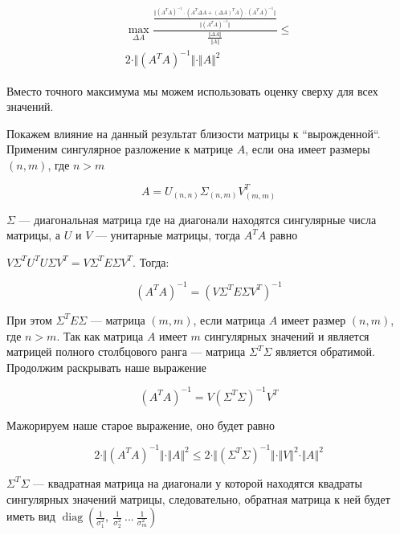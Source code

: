 \documentclass{article}
\begin{document}
    \[
        \begin{gathered}
            \max_{\Delta A} \frac{ \frac{\Vert  (A^{T} A)^{-1} \cdot (A^{T} \Delta A + (\Delta A)^{T} A) \cdot (A^{T} A)^{-1} \Vert }{\Vert (A^T A)^{-1} \Vert} }{ \frac{\Vert \Delta A \Vert}{\Vert A \Vert} } \leq \\
            2 \cdot \Vert (A^{T} A)^{-1} \Vert \cdot \Vert A \Vert^{2}
        \end{gathered}
    \]

    Вместо точного максимума мы можем использовать оценку сверху для всех значений.

    Покажем влияние на данный результат близости матрицы к ``вырожденной``.
    Применим сингулярное разложение к матрице $A$, если она имеет размеры $(n, m)$, где $n > m$

    \begin{equation}
        A = U_{(n, n)} \Sigma_{(n, m)} V^{T}_{(m, m)}
    \end{equation}

    $\Sigma$ --- диагональная матрица где на диагонали находятся сингулярные числа матрицы, а $U$ и $V$ --- унитарные матрицы, тогда
    $A^{T}A$ равно

    $V \Sigma^{T} U^{T}  U \Sigma V^{T} = V \Sigma^{T} E \Sigma V^{T}$.
    Тогда:

    \begin{equation}
    (A^{T}A)^{-1} = (V \Sigma^{T} E \Sigma V^{T})^{-1}
    \end{equation}

    При этом $\Sigma^{T} E \Sigma $ --- матрица $(m, m)$, если матрица $A$ имеет размер $(n, m)$, где $n > m$.
    Так как матрица $A$ имеет $m$ сингулярных значений и является матрицей полного столбцового ранга ---
    матрица $\Sigma^{T} \Sigma$ является обратимой.
    Продолжим раскрывать наше выражение

    \begin{equation}
        (A^{T}A)^{-1} = V (\Sigma^{T} \Sigma)^{-1} V^{T}
    \end{equation}

    Мажорируем наше старое выражение, оно будет равно

    \begin{equation}
        2 \cdot \Vert (A^{T} A)^{-1} \Vert \cdot \Vert A \Vert^{2} \leq 2 \cdot \Vert (\Sigma^{T} \Sigma)^{-1} \Vert \cdot \Vert V \Vert^{2} \cdot \Vert A \Vert^{2}
    \end{equation}

    $\Sigma^{T} \Sigma$ --- квадратная матрица на диагонали у которой находятся квадраты сингулярных значений матрицы,
    следовательно, обратная матрица к ней будет иметь вид $\operatorname{diag}(\frac{1}{\sigma_{1}^{2} }, \ \frac{1}{\sigma_{2}^{2} } \ ... \ \frac{1}{\sigma_{m}^{2} })$
\end{document}
